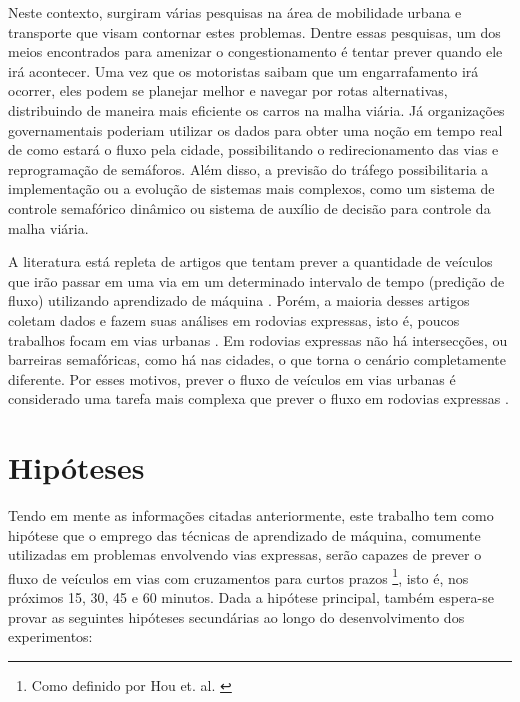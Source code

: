 Neste contexto, surgiram várias pesquisas na área de mobilidade urbana e transporte que visam contornar estes problemas. Dentre essas pesquisas, um dos meios encontrados para amenizar o congestionamento é tentar prever quando ele irá acontecer. Uma vez que os motoristas saibam que um engarrafamento irá ocorrer, eles podem se planejar melhor e navegar por rotas alternativas, distribuindo de maneira mais eficiente os carros na malha viária. Já organizações governamentais poderiam utilizar os dados para obter uma noção em tempo real de como estará o fluxo pela cidade, possibilitando o redirecionamento das vias e reprogramação de semáforos. Além disso, a previsão do tráfego possibilitaria a implementação ou a evolução de sistemas mais complexos, como um sistema de controle semafórico dinâmico ou sistema de auxílio de decisão para controle da malha viária.

A literatura está repleta de artigos que tentam prever a quantidade de veículos que irão passar em uma via em um determinado intervalo de tempo (predição de fluxo) utilizando aprendizado de máquina \cite{doi:10.1080/01441647.2014.992496, fu2016using, hamed_prediction_1995, lv_6894591, Seoul, wang_2018, Xiaolei_2015, Zainab_2018}. Porém, a maioria desses artigos coletam dados e fazem suas análises em rodovias expressas, isto é, poucos trabalhos focam em vias urbanas \cite{lana_2018}. Em rodovias expressas não há intersecções, ou barreiras semafóricas, como há nas cidades, o que torna o cenário completamente diferente. Por esses motivos, prever o fluxo de veículos em vias urbanas é considerado uma tarefa mais complexa que prever o fluxo em rodovias expressas \cite{lana_2018}.

\section{Hipóteses}
\label{chapter:hipoteses}
Tendo em mente as informações citadas anteriormente, este trabalho tem como hipótese que o emprego das técnicas de aprendizado de máquina, comumente utilizadas em problemas envolvendo vias expressas, serão capazes de prever o fluxo de veículos em vias com cruzamentos para curtos prazos \footnote{Como definido por Hou et. al. \cite{hou2014traffic}}, isto é, nos próximos 15, 30, 45 e 60 minutos. Dada a hipótese principal, também espera-se provar as seguintes hipóteses secundárias ao longo do desenvolvimento dos experimentos:

